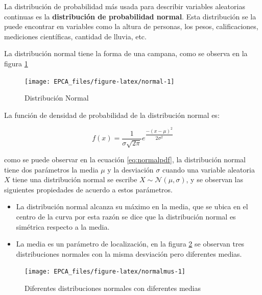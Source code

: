 \documentclass[
]{krantz}
\providecommand{\tightlist}{%
  \setlength{\itemsep}{0pt}\setlength{\parskip}{0pt}}
\begin{document}
La distribución de probabilidad más usada para describir variables aleatorias continuas es la \textbf{distribución de probabilidad normal}. Esta distribución se la puede encontrar en variables como la altura de personas, los pesos, calificaciones, mediciones científicas, cantidad de lluvia, etc.

La distribución normal tiene la forma de una campana, como se observa en la figura \ref{fig:normal}

\begin{figure}[h!]

{\centering \texttt{[image: EPCA\_files/figure-latex/normal-1]} 

}

\caption{Distribución Normal}\label{fig:normal}
\end{figure}

La función de densidad de probabilidad de la distribución normal es:

\begin{equation} 
f\left(x\right)=\dfrac{1}{\sigma\sqrt{2\pi}}e^{\dfrac{-\left(x-\mu\right)^2}{2\sigma^2}}
\label{eq:normalpdf}
\end{equation}

como se puede observar en la ecuación \eqref{eq:normalpdf}, la distribución normal tiene dos parámetros la media \(\mu\) y la desviación \(\sigma\) cuando una variable aleatoria \(X\) tiene una distribución normal se escribe \(X \sim \mathcal{N}\left(\mu,\sigma \right)\), y se observan las siguientes propiedades de acuerdo a estos parámetros.

\begin{itemize}
\tightlist
\item
  La distribución normal alcanza su máximo en la media, que se ubica en el centro de la curva por esta razón se dice que la distribución normal es simétrica respecto a la media.
\item
  La media es un parámetro de localización, en la figura \ref{fig:normalmus} se observan tres distribuciones normales con la misma desviación pero diferentes medias.
\end{itemize}

\begin{figure}[h!]

{\centering \texttt{[image: EPCA\_files/figure-latex/normalmus-1]} 

}

\caption{Diferentes distribuciones normales con diferentes medias}\label{fig:normalmus}
\end{figure}
\end{document}
